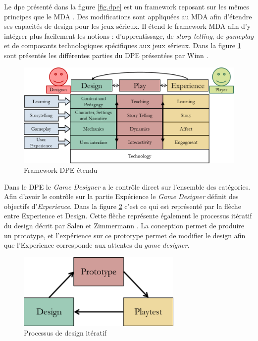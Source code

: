 Le \gls{dpe} présenté dans la figure \ref{fig.dpe} est un framework reposant sur les mêmes principes que le MDA . 
Des modifications sont appliquées au MDA afin d'étendre ses capacités de design pour les jeux sérieux. 
Il étend le framework MDA afin d'y intégrer plus facilement les notions : d'apprentissage, de  \emph{story telling}, de  \emph{gameplay} et de composants technologiques spécifiques aux jeux sérieux. 
Dans la figure \ref{fig.dpe_extended} sont présentés les différentes parties du DPE présentées par Winn \cite{Winn2011}.


\begin{figure}[H]
    \centering
    \includegraphics[width=14cm]{10_img/chap3/dpe_extended.png} 
    \caption{Framework DPE étendu \cite{Winn2011}}
    \label{fig.dpe_extended}
\end{figure}


Dans le DPE le \emph{Game Designer} a le contrôle direct sur l'ensemble des catégories. 
Afin d'avoir le contrôle sur la partie Expérience le \emph{Game Designer} définit des objectifs d'\emph{Experience}. 
Dans la figure \ref{fig.dpe_iteratif} c'est ce qui est représenté par la flèche entre Experience et Design. 
Cette flèche représente également le processus itératif du design décrit par Salen et Zimmermann \cite{Salen2013}. 
La conception permet de produire un prototype, et l'expérience sur ce prototype permet de modifier le design afin que l'Experience corresponde aux attentes du \emph{game designer}.

\begin{figure}[H]
    \centering
    \includegraphics[width=8cm]{10_img/chap3/iteration_prototype.png} 
    \caption{Processus de design itératif \cite{Winn2011}}
    \label{fig.dpe_iteratif}
\end{figure}





